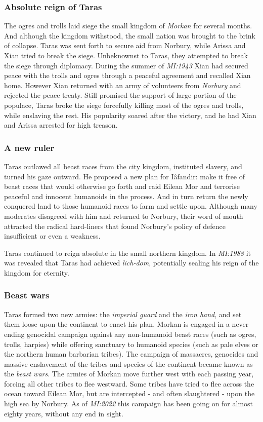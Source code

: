 \subsubsection*{Absolute reign of Taras}

The ogres and trolls laid siege the small kingdom of \emph{Morkan} for several
months. And although the kingdom withstood, the small nation was brought to
the brink of collapse. Taras was sent forth to secure aid from Norbury, while
Arissa and Xian tried to break the siege. Unbeknownst to Taras, they attempted
to break the siege through diplomacy. During the summer of \emph{MI:1943} Xian
had secured peace with the trolls and ogres through a peaceful agreement and
recalled Xian home.  However Xian returned with an army of volunteers from
\emph{Norbury} and rejected the peace treaty. Still promised the support of
large portion of the populace, Taras broke the siege forcefully killing most
of the ogres and trolls, while enslaving the rest. His popularity soared after
the victory, and he had Xian and Arissa arrested for high treason.

\subsubsection*{A new ruler}

Taras outlawed all beast races from the city kingdom, instituted slavery,
and turned his gaze outward. He proposed a new plan for Iâfandir: make it free
of beast races that would otherwise go forth and raid Eilean Mor and terrorise
peaceful and innocent humanoids in the process. And in turn return the newly
conquered land to those humanoid races to farm and settle upon. Although many
moderates disagreed with him and returned to Norbury, their word of mouth
attracted the radical hard-liners that found Norbury's policy of defence
insufficient or even a weakness.

Taras continued to reign absolute in the small northern kingdom. In
\emph{MI:1988} it was revealed that Taras had achieved \emph{lich-dom},
potentially sealing his reign of the kingdom for eternity.

\subsubsection*{Beast wars}

Taras formed two new armies: the \emph{imperial guard} and the \emph{iron
  hand}, and set them loose upon the continent to enact his plan. Morkan is
engaged in a never ending genocidal campaign against any non-humanoid beast
races (such as ogres, trolls, harpies) while offering sanctuary to humanoid
species (such as pale elves or the northern human barbarian tribes). The
campaign of massacres, genocides and massive enslavement of the tribes and
species of the continent became known as the \emph{beast wars}. The armies of
Morkan move further west with each passing year, forcing all other tribes
to flee westward. Some tribes have tried to flee across the ocean toward
Eilean Mor, but are intercepted - and often slaughtered - upon the high sea
by Norbury. As of \emph{MI:2022} this campaign has been going on for almost
eighty years, without any end in sight.

